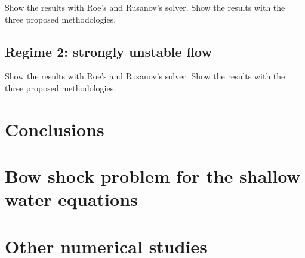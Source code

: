 \documentclass[preprint, 11pt]{article}
\begin{document}
Show the results with Roe's and Rusanov's solver. 
Show the results with the three proposed methodologies. 

\subsection{Regime 2: strongly unstable flow}

Show the results with Roe's and Rusanov's solver. 
Show the results with the three proposed methodologies. 

\section{Conclusions}

\appendix
\section{Bow shock problem for the shallow water equations}

\section{Other numerical studies}

%


\end{document}
